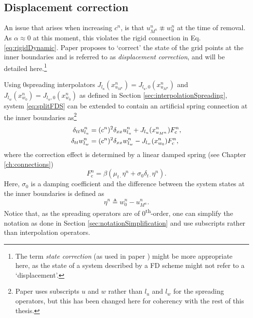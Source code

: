 \subsection{Displacement correction}
An issue that arises when increasing $c^n$, is that $u_{M^n}^n \not\approx w_0^n$ at the time of removal. As $\alpha \approx 0$ at this moment, this violates the rigid connection in Eq. \eqref{eq:rigidDynamic}.
Paper \citeP[G] proposes to `correct' the state of the grid points at the inner boundaries and is referred to as \textit{displacement correction}, and will be detailed here.\footnote{The term \textit{state correction} (as used in paper \citeP[H]) might be more appropriate here, as the state of a system described by a FD scheme might not refer to a `displacement'.} 

Using 0\thOrder spreading interpolators  $J_{l_u}(x_{u_{M^n}}^n) = J_{l_u, 0}(x_{u_{M^n}}^n)$ and \linebreak$J_{l_w}(x_{w_0}^n) = J_{l_w,0}(x_{w_0}^n)$ as defined in Section \ref{sec:interpolationSpreading}, system \eqref{eq:splitFDS} can be extended to contain an artificial spring connection at the inner boundaries as\footnote{Paper \citeP[G] uses subscripts $u$ and $w$ rather than $l_u$ and $l_w$ for the spreading operators, but this has been changed here for coherency with the rest of this thesis.}
\begin{subequations}\label{eq:sysDispCorr}
\begin{align}
    \delta_{tt}\ulun &= (c^n)^2\delta_{xx}\ulun+ J_{l_u}(x_{u_{M^n}}^n)%
    F_\text{c}^n,\\
    \delta_{tt}\wlwn &= (c^n)^2\delta_{xx}\wlwn - J_{l_w}(x_{w_0}^n)%
    F_\text{c}^n,
\end{align}
\end{subequations}
where the correction effect %
is determined by a linear damped spring (see Chapter \ref{ch:connections})
\begin{equation}\label{eq:dispCorrForce}
    F_\text{c}^n = \beta \left(\mu_{t\cdot}\eta^n +\sigma_0\delta_{t\cdot}\eta^n \right).
\end{equation}
Here, $\sigma_0$ is a damping coefficient and the difference between the system states at the inner boundaries is defined as
\begin{equation}\label{eq:etaDispCorr}
    \eta^n \triangleq w_0^n - u_{M^n}^n.
\end{equation}
Notice that, as the spreading operators are of 0\textsuperscript{th}-order, one can simplify the notation as done in Section \ref{sec:notationSimplification} and use subscripts rather than interpolation operators.

